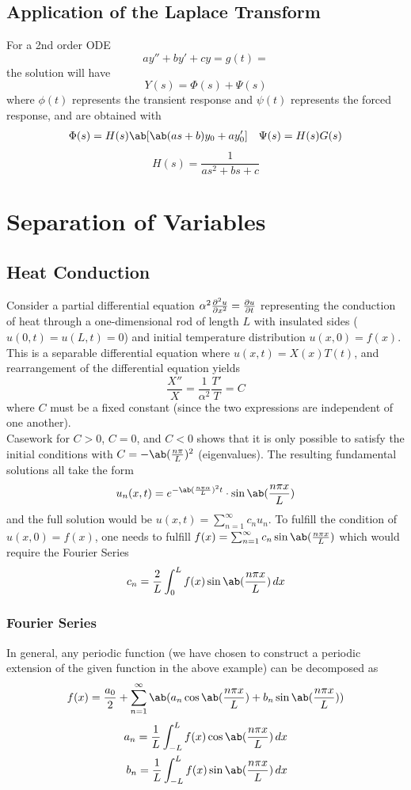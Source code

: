 \documentclass{article}
\begin{document}
\subsection{Application of the Laplace Transform}
For a 2nd order ODE
$$ay''+by'+cy=g(t)=$$ the solution will have
$$Y(s)=\Phi(s)+\Psi(s)$$
where $\phi(t)$ represents the transient response and $\psi(t)$ represents the forced response, and are obtained with \begin{align*} \Phi(s)=H(s)\ab[\ab(as+b)y_0+ay_0'] && \Psi(s)=H(s)G(s)
\end{align*}
$$H(s)=\frac{1}{as^2+bs+c}$$

\section{Separation of Variables}
\subsection{Heat Conduction}
Consider a partial differential equation
$\alpha^2\pdv[order=2,2]{u}{x}=\pdv{u}{t}$ representing the conduction of heat through a one-dimensional rod of length $L$ with insulated sides ($u(0,t)=u(L,t)=0$) and initial temperature distribution $u(x,0)=f(x)$. This is a separable differential equation where $u(x,t)=X(x)T(t)$, and rearrangement of the differential equation yields
$$\frac{X''}{X}=\frac{1}{\alpha^2}\frac{T'}{T}=C$$
where $C$ must be a fixed constant (since the two expressions are independent of one another).\\
Casework for $C > 0$, $C = 0$, and $C<0$ shows that it is only possible to satisfy the initial conditions with $C=-\ab(\frac{n\pi}{L})^2$ (eigenvalues). The resulting fundamental solutions all take the form $$u_n(x,t)=e^{-\ab(\frac{n\pi\alpha}{L})^2t}\cdot\sin\ab(\frac{n\pi x}{L})$$ and the full solution would be $u(x,t)=\sum_{n=1}^\infty c_nu_n$. To fulfill the condition of $u(x,0)=f(x)$, one needs to fulfill $f(x)=\sum_{n=1}^\infty c_n\sin\ab(\frac{n\pi x}{L})$ which would require the Fourier Series 
$$c_n=\frac{2}{L}\int_0^L f(x)\sin\ab(\frac{n\pi x}{L})\,dx$$

\subsubsection{Fourier Series}
In general, any periodic function (we have chosen to construct a periodic extension of the given function in the above example) can be decomposed as
$$f(x)=\frac{a_0}{2}+\sum_{n=1}^\infty\ab(a_n\cos\ab(\frac{n\pi x}{L}) + b_n\sin\ab(\frac{n\pi x}{L}))$$
\begin{align*}
    a_n=\frac{1}{L}\int_{-L}^L f(x)\cos\ab(\frac{n\pi x}{L})\,dx\\
    b_n=\frac{1}{L}\int_{-L}^L f(x)\sin\ab(\frac{n\pi x}{L})\,dx\\
\end{align*}
\end{document}

